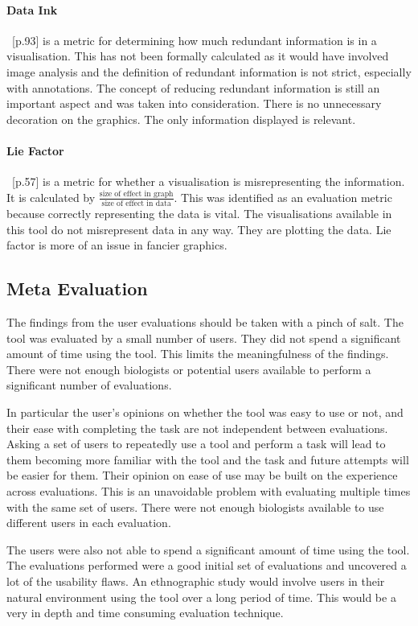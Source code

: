 \paragraph{Data Ink}~\cite{tufte}[p.93] is a metric for determining how much redundant information is in a visualisation.  This has not been formally calculated as it would have involved image analysis and the definition of redundant information is not strict, especially with annotations.  The concept of reducing redundant information is still an important aspect and was taken into consideration.  There is no unnecessary decoration on the graphics.  The only information displayed is relevant.

\paragraph{Lie Factor}~\cite{tufte}[p.57] is a metric for whether a visualisation is misrepresenting the information.  It is calculated by $\frac{\text{size of effect in graph}}{\text{size of effect in data}}$.  This was identified as an evaluation metric because correctly representing the data is vital.  The visualisations available in this tool do not misrepresent data in any way.  They are plotting the data.  Lie factor is more of an issue in fancier graphics.

\subsection{Meta Evaluation}
The findings from the user evaluations should be taken with a pinch of salt.  The tool was evaluated by a small number of users.  They did not spend a significant amount of time using the tool.  This limits the meaningfulness of the findings.  There were not enough biologists or potential users available to perform a significant number of evaluations.

In particular the user's opinions on whether the tool was easy to use or not, and their ease with completing the task are not independent between evaluations.  Asking a set of users to repeatedly use a tool and perform a task will lead to them becoming more familiar with the tool and the task and future attempts will be easier for them.  Their opinion on ease of use may be built on the experience across evaluations.  This is an unavoidable problem with evaluating multiple times with the same set of users.  There were not enough biologists available to use different users in each evaluation.

The users were also not able to spend a significant amount of time using the tool.  The evaluations performed were a good initial set of evaluations and uncovered a lot of the usability flaws.  An ethnographic study would involve users in their natural environment using the tool over a long period of time.  This would be a very in depth and time consuming evaluation technique.

